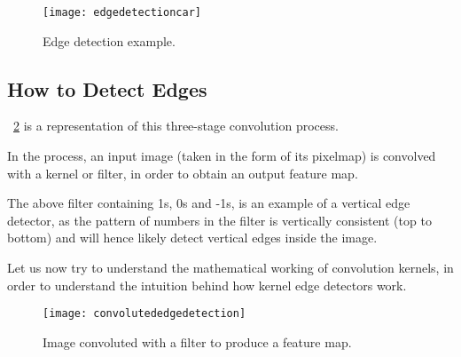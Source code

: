 	\begin{figure}[htb]
		\centering
		\texttt{[image: edgedetectioncar]}
		\caption[Edge detection example]{Edge detection example.}
		\label{fig:edgedetectioncar}
	\end{figure}

	\subsection{How to Detect Edges}

	\begin{bulletedlist}
		\item \figurename~\ref{fig:convolutededgedetection} is a representation of this three-stage convolution process.
		\item In the process, an input image (taken in the form of its pixelmap) is convolved with a kernel or filter, 	in order to obtain an output feature map.
		\item The above filter containing 1s, 0s and -1s, is an example of a vertical edge detector, as the pattern of numbers in the filter is vertically consistent (top to bottom) and will hence likely detect vertical edges inside the image.
		\item Let us now try to understand the mathematical working of convolution kernels, in order to understand the intuition behind how kernel edge detectors work.
	\end{bulletedlist}

	\begin{figure}[htb]
		\centering
		\texttt{[image: convolutededgedetection]}
		\caption{Image convoluted with a filter to produce a feature map.}
		\label{fig:convolutededgedetection}
	\end{figure}

